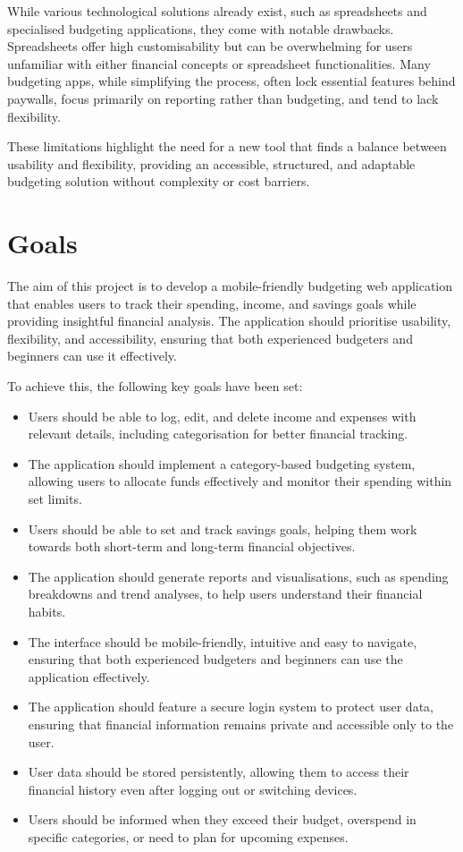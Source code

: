 \documentclass{l4proj}
\begin{document}
While various technological solutions already exist, such as spreadsheets and specialised budgeting applications, they come with notable drawbacks. Spreadsheets offer high customisability but can be overwhelming for users unfamiliar with either financial concepts or spreadsheet functionalities. Many budgeting apps, while simplifying the process, often lock essential features behind paywalls, focus primarily on reporting rather than budgeting, and tend to lack flexibility.

These limitations highlight the need for a new tool that finds a balance between usability and flexibility, providing an accessible, structured, and adaptable budgeting solution without complexity or cost barriers.

\section{Goals}

The aim of this project is to develop a mobile-friendly budgeting web application that enables users to track their spending, income, and savings goals while providing insightful financial analysis. The application should prioritise usability, flexibility, and accessibility, ensuring that both experienced budgeters and beginners can use it effectively.

To achieve this, the following key goals have been set:

\begin{itemize}
    \item Users should be able to log, edit, and delete income and expenses with relevant details, including categorisation for better financial tracking.
    \item The application should implement a category-based budgeting system, allowing users to allocate funds effectively and monitor their spending within set limits.
    \item Users should be able to set and track savings goals, helping them work towards both short-term and long-term financial objectives.
    \item The application should generate reports and visualisations, such as spending breakdowns and trend analyses, to help users understand their financial habits.
    \item The interface should be mobile-friendly, intuitive and easy to navigate, ensuring that both experienced budgeters and beginners can use the application effectively.
    \item The application should feature a secure login system to protect user data, ensuring that financial information remains private and accessible only to the user.
    \item User data should be stored persistently, allowing them to access their financial history even after logging out or switching devices.
    \item Users should be informed when they exceed their budget, overspend in specific categories, or need to plan for upcoming expenses.
\end{itemize}
\end{document}
